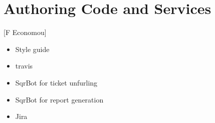 \section{Authoring Code and Services} [F Economou]
\begin{itemize}
\item Style guide
\item travis
\item SqrBot for ticket unfurling
\item SqrBot for report generation
\item Jira
\end{itemize}
